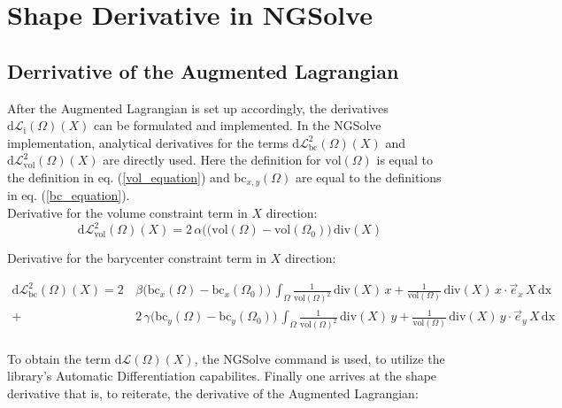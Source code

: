 
\section{Shape Derivative in NGSolve}
\subsection{Derrivative of the Augmented Lagrangian}

After the Augmented Lagrangian is set up accordingly, the derivatives $\mathrm{d}\mathcal{L}_{\mathrm{i}}(\Omega)(X)$ can be formulated and implemented.
In the NGSolve implementation, analytical derivatives for the terms $\mathrm{d}\mathcal{L}^2_{\mathrm{bc}}(\Omega)(X)$ 
and $\mathrm{d}\mathcal{L}^2_{\mathrm{vol}}(\Omega)(X)$ are directly used. Here the definition for $\mathrm{vol}(\Omega)$ is equal to
the definition in eq. (\ref{vol_equation}) and $\mathrm{bc}_{x,y}(\Omega)$ are equal to the definitions in eq. (\ref{bc_equation}).\\

Derivative for the volume constraint term in $X$ direction:
\begin{equation}\label{eq:constraints_vol}
	\mathrm{d}\mathcal{L}^2_{\mathrm{vol}}(\Omega)(X) = 2 \, \alpha \Big( (\mathrm{vol}(\Omega) - \mathrm{vol}(\Omega_0) \Big) \, \mathrm{div}(X)
\end{equation}

Derivative for the barycenter constraint term in $X$ direction:

\begin{equation}\label{eq:constraints_bc}
	\begin{aligned}
	\mathrm{d}\mathcal{L}^2_{\mathrm{bc}}(\Omega)(X) =
	2& \, \beta \Big( \mathrm{bc}_x(\Omega) - \mathrm{bc}_x(\Omega_0) \Big) \, \int_{\Omega} \frac{1}{\mathrm{vol}(\Omega)^2} \, \mathrm{div}(X) \, x 
	+ \frac{1}{\mathrm{vol}(\Omega)} \, \mathrm{div}(X) \, x \cdot \vec{e}_x \, X \, \mathrm{dx} \\
	+& \, 2 \, \gamma \Big( \mathrm{bc}_y(\Omega) - \mathrm{bc}_y(\Omega_0) \Big) \, \int_{\Omega} \frac{1}{\mathrm{vol}(\Omega)^2} \, \mathrm{div}(X) \, y 
	+ \frac{1}{\mathrm{vol}(\Omega)} \, \mathrm{div}(X) \, y \cdot \vec{e}_y \, X\, \mathrm{dx}
	\end{aligned}
\end{equation}
\\
To obtain the term $\mathrm{d}\mathcal{L}(\Omega)(X)$, the NGSolve command  is used, to utilize the library's Automatic Differentiation
capabilites. Finally one arrives at the shape derivative that is, to reiterate, the derivative of the Augmented Lagrangian:


